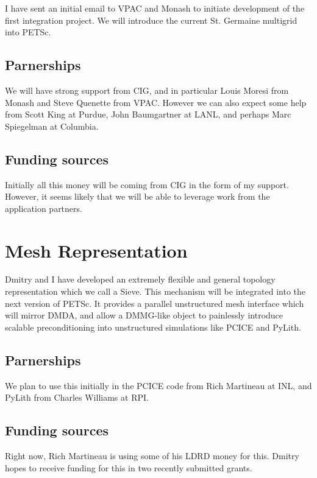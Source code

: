 	I have sent an initial email to VPAC and Monash to initiate development of the first integration project. We
will introduce the current St. Germaine multigrid into PETSc.

  \subsection{Parnerships}

	We will have strong support from CIG, and in particular Louis Moresi from Monash and Steve Quenette from VPAC.
However we can also expect some help from Scott King at Purdue, John Baumgartner at LANL, and perhaps Marc Spiegelman at
Columbia.

  \subsection{Funding sources}

	Initially all this money will be coming from CIG in the form of my support. However, it seems likely that we
will be able to leverage work from the application partners.

\section{Mesh Representation}

	Dmitry and I have developed an extremely flexible and general topology representation which we call a Sieve.
This mechanism will be integrated into the next version of PETSc. It provides a parallel unstructured mesh interface
which will mirror DMDA, and allow a DMMG-like object to painlessly introduce scalable preconditioning into unstructured
simulations like PCICE and PyLith.

  \subsection{Parnerships}

	We plan to use this initially in the PCICE code from Rich Martineau at INL, and PyLith from Charles Williams at
RPI.

  \subsection{Funding sources}

	Right now, Rich Martineau is using some of his LDRD money for this. Dmitry hopes to receive funding for this in
two recently submitted grants.
